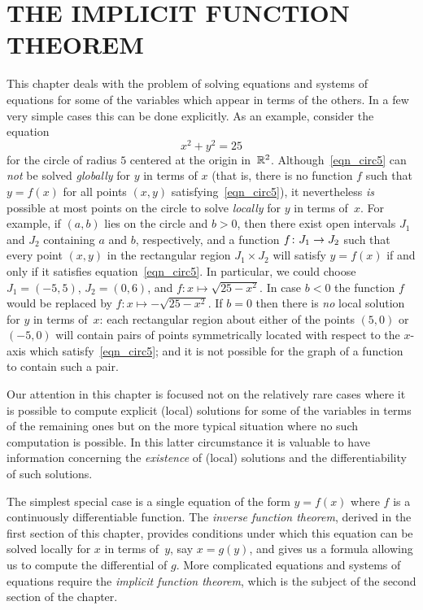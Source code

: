 \chapter{THE IMPLICIT FUNCTION THEOREM}\label{IFT}

This chapter deals with the problem of solving equations and systems of equations for some of
the variables which appear in terms of the others.  In a few very simple cases this can be
done explicitly.  As an example, consider the equation
  \begin{equation}\label{eqn_circ5}
      x^2 + y^2 = 25
  \end{equation}
for the circle of radius $5$ centered at the origin in~$\mathbb{R}^2$.  Although~\eqref{eqn_circ5} can
\emph{not} be solved \emph{globally} for $y$ in terms of $x$ (that is, there is no function
$f$ such that $y = f(x)$ for all points $(x,y)$ satisfying~\eqref{eqn_circ5}),  it
nevertheless \emph{is} possible at most points on the circle to solve \emph{locally} for $y$
in terms of~$x$.  For example, if $(a,b)$ lies on the circle and $b > 0$, then there exist
open intervals $J_1$ and $J_2$ containing $a$ and $b$, respectively, and a function $f \colon
J_1 \rightarrow J_2$ such that every point $(x,y)$ in the rectangular region $J_1 \times J_2$ will
satisfy $y = f(x)$ if and only if it satisfies equation~\eqref{eqn_circ5}.  In particular, we
could choose $J_1 = (-5,5)$, $J_2 = (0,6)$, and $f \colon x \mapsto \sqrt{25 - x^2}$. In case
$b < 0$ the function $f$ would be replaced by  $f:x \mapsto - \sqrt{25 - x^2}$.  If $b = 0$
then there is \emph{no} local solution for $y$ in terms of~$x$: each rectangular region about
either of the points $(5,0)$ or $(-5,0)$ will contain pairs of points symmetrically located
with respect to the  $x$-axis which satisfy~\eqref{eqn_circ5}; and it is not possible for the
graph of a function to contain such a pair.

Our attention in this chapter is focused not on the relatively rare cases where it is possible
to compute explicit (local) solutions for some of the variables in terms of the remaining ones
but on the more typical situation where no such computation is possible.  In this latter
circumstance it is valuable to have information concerning the \emph{existence} of (local)
solutions and the differentiability of such solutions.

The simplest special case is a single equation of the form $y = f(x)$ where $f$ is a
continuously differentiable function.  The \emph{inverse function theorem}, derived in the
first section of this chapter, provides conditions under which this equation can be solved
locally for $x$ in terms of~$y$, say $x = g(y)$, and gives us a formula allowing us to compute
the differential of $g$. More complicated equations and systems of equations require the
\emph{implicit function theorem}, which is the subject of the second section of the chapter.







